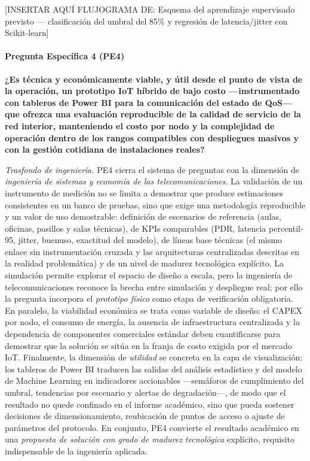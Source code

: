 \documentclass[
  12pt,
]{article}
\begin{document}
{[}INSERTAR AQUÍ FLUJOGRAMA DE: Esquema del aprendizaje supervisado
previsto — clasificación del umbral del 85\% y regresión de
latencia/jitter con Scikit-learn{]}

\paragraph{Pregunta Específica 4
(PE4)}\label{pregunta-especuxedfica-4-pe4}

\textbf{¿Es técnica y económicamente viable, y útil desde el punto de
vista de la operación, un prototipo IoT híbrido de bajo costo
—instrumentado con tableros de Power BI para la comunicación del estado
de QoS— que ofrezca una evaluación reproducible de la calidad de
servicio de la red interior, manteniendo el costo por nodo y la
complejidad de operación dentro de los rangos compatibles con
despliegues masivos y con la gestión cotidiana de instalaciones reales?}

\emph{Trasfondo de ingeniería.} PE4 cierra el sistema de preguntas con
la dimensión de \emph{ingeniería de sistemas y economía de las
telecomunicaciones}. La validación de un instrumento de medición no se
limita a demostrar que produce estimaciones consistentes en un banco de
pruebas, sino que exige una metodología reproducible y un valor de uso
demostrable: definición de escenarios de referencia (aulas, oficinas,
pasillos y salas técnicas), de KPIs comparables (PDR, latencia
percentil-95, jitter, buenuso, exactitud del modelo), de líneas base
técnicas (el mismo enlace sin instrumentación cruzada y las
arquitecturas centralizadas descritas en la realidad problemática) y de
un nivel de madurez tecnológica explícito. La simulación permite
explorar el espacio de diseño a escala, pero la ingeniería de
telecomunicaciones reconoce la brecha entre simulación y despliegue
real; por ello la pregunta incorpora el \emph{prototipo físico} como
etapa de verificación obligatoria. En paralelo, la viabilidad económica
se trata como variable de diseño: el CAPEX por nodo, el consumo de
energía, la ausencia de infraestructura centralizada y la dependencia de
componentes comerciales estándar deben cuantificarse para demostrar que
la solución se sitúa en la franja de costo exigida por el mercado IoT.
Finalmente, la dimensión de \emph{utilidad} se concreta en la capa de
visualización: los tableros de Power BI traducen las salidas del
análisis estadístico y del modelo de Machine Learning en indicadores
accionables —semáforos de cumplimiento del umbral, tendencias por
escenario y alertas de degradación—, de modo que el resultado no quede
confinado en el informe académico, sino que pueda sostener decisiones de
dimensionamiento, reubicación de puntos de acceso o ajuste de parámetros
del protocolo. En conjunto, PE4 convierte el resultado académico en una
\emph{propuesta de solución con grado de madurez tecnológica} explícito,
requisito indispensable de la ingeniería aplicada.
\end{document}
